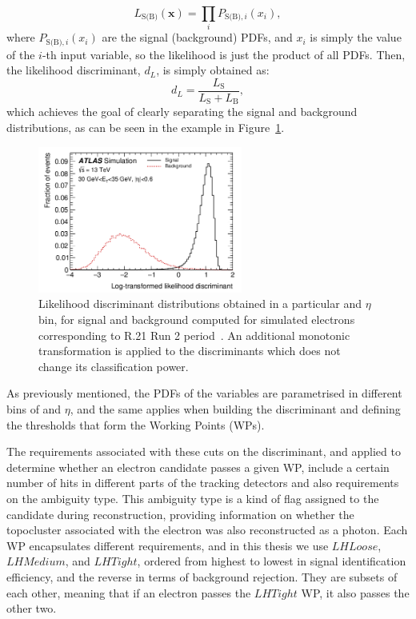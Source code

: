 \begin{equation}
  L_{\text{S(B)}} (\textbf{x}) = \prod_{i} P_{\text{S(B)},i}(x_{i}),
\end{equation}
where $P_{\text{S(B)},i}(x_{i})$ are the signal (background) PDFs, and $x_{i}$ is simply the value of the $i$-th input variable, so the likelihood is just the product of all PDFs.
Then, the likelihood discriminant, $d_{L}$, is simply obtained as:
\begin{equation}
  d_{L} = \frac{L_{\text{S}}}{L_{\text{S}} + L_{\text{B}}},
\end{equation}
which achieves the goal of clearly separating the signal and background distributions, as can be seen in the example in Figure~\ref{fig:lhdis}.
\begin{figure}[htbp]
  \centering
  \includegraphics[width=0.6\textwidth]{images/lhdis.png}
  \caption{Likelihood discriminant distributions obtained in a particular \pt and $\eta$ bin, for signal and background computed for simulated electrons corresponding to R.21 Run 2 period~\cite{Aaboud:2657964}. An additional monotonic transformation is applied to the discriminants which does not change its classification power.}
  \label{fig:lhdis}
\end{figure}

As previously mentioned, the PDFs of the variables are parametrised in different bins of \pt and $\eta$, and the same applies when building the discriminant and defining the thresholds that form the Working Points (WPs).

The requirements associated with these cuts on the discriminant, and applied to determine whether an electron candidate passes a given WP, include a certain number of hits in different parts of the tracking detectors and also requirements on the ambiguity type. This ambiguity type is a kind of flag assigned to the candidate during reconstruction, providing information on whether the topocluster associated with the electron was also reconstructed as a photon.
Each WP encapsulates different requirements, and in this thesis we use $LHLoose$, $LHMedium$, and $LHTight$, ordered from highest to lowest in signal identification efficiency, and the reverse in terms of background rejection. They are subsets of each other, meaning that if an electron passes the $LHTight$ WP, it also passes the other two.


